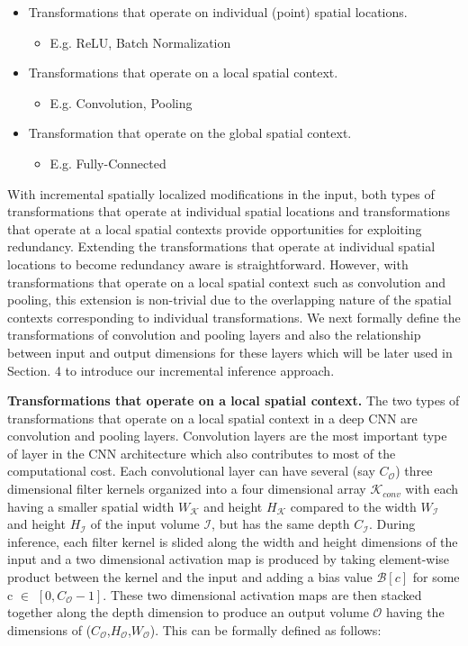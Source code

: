 \begin{itemize}
	\item Transformations that operate on individual (point) spatial locations.
	\begin{itemize}
	 \item E.g. ReLU, Batch Normalization
	\end{itemize}
	\item Transformations that operate on a local spatial context.
	\begin{itemize}
	 \item E.g. Convolution, Pooling
	\end{itemize}
	\item Transformation that operate on the global spatial context.
	\begin{itemize}
	 \item E.g. Fully-Connected
	\end{itemize}
\end{itemize}

With incremental spatially localized modifications in the input, both types of transformations that operate at individual spatial locations and transformations that operate at a local spatial contexts provide opportunities for exploiting redundancy. Extending the transformations that operate at individual spatial locations to become redundancy aware is straightforward. However, with transformations that operate on a local spatial context such as convolution and pooling, this extension is non-trivial due to the overlapping nature of the spatial contexts corresponding to individual transformations. We next formally define the transformations of convolution and pooling layers and also the relationship between input and output dimensions for these layers which will be later used in Section. 4 to introduce our incremental inference approach.


\vspace{2mm}
\noindent \textbf{Transformations that operate on a local spatial context.} The two types of transformations that operate on a local spatial context in a deep CNN are convolution and pooling layers. Convolution layers are the most important type of layer in the CNN architecture which also contributes to most of the computational cost. Each convolutional layer can have several (say $C_{\mathcal{O}}$) three dimensional filter kernels organized into a four dimensional array $\mathcal{K}_{conv}$ with each having a smaller spatial width $W_\mathcal{K}$ and height $H_\mathcal{K}$ compared to the width $W_{\mathcal{I}}$ and height $H_{\mathcal{I}}$ of the input volume $\mathcal{I}$, but has the same depth $C_{\mathcal{I}}$. During inference, each filter kernel is slided along the width and height dimensions of the input and a two dimensional activation map is produced by taking element-wise product between the kernel and the input and adding a bias value $\mathcal{B}[c]$ for some c $\in$ $[0, C_{\mathcal{O}}-1]$. These two dimensional activation maps are then stacked together along the depth dimension to produce an output volume $\mathcal{O}$ having the dimensions of ($C_{\mathcal{O}}$,$H_{\mathcal{O}}$,$W_{\mathcal{O}}$). This can be formally defined as follows:


